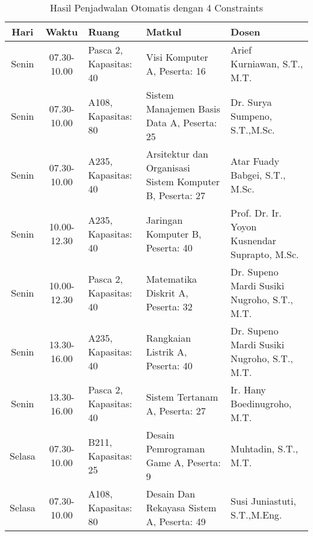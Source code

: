 \begin{longtable}[c]{|c|c|>{\centering\arraybackslash}m{2.5cm}|>{\centering\arraybackslash}m{4cm}|>{\centering\arraybackslash}m{3.2cm}|}
  \caption{Hasil Penjadwalan Otomatis dengan 4 Constraints}
  \label{tab:4}\\
  \hline
  \rowcolor[HTML]{C0C0C0} 
  Hari   & Waktu       & Ruang                  & Matkul                                                              & Dosen                                         \\ \hline
  Senin  & 07.30-10.00 & Pasca 2, Kapasitas: 40 & Visi Komputer A, \linebreak Peserta: 16                             & Arief Kurniawan, S.T., M.T.                   \\ \hline
  Senin  & 07.30-10.00 & A108, Kapasitas: 80    & Sistem Manajemen Basis Data A, \linebreak Peserta: 25               & Dr. Surya Sumpeno, S.T.,M.Sc.                 \\ \hline
  Senin  & 07.30-10.00 & A235, Kapasitas: 40    & Arsitektur dan Organisasi Sistem Komputer B, \linebreak Peserta: 27 & Atar Fuady Babgei, S.T., M.Sc.                \\ \hline
  Senin  & 10.00-12.30 & A235, Kapasitas: 40    & Jaringan Komputer B, \linebreak Peserta: 40                         & Prof. Dr. Ir. Yoyon Kusnendar Suprapto, M.Sc. \\ \hline
  Senin  & 10.00-12.30 & Pasca 2, Kapasitas: 40 & Matematika Diskrit A, \linebreak Peserta: 32                        & Dr. Supeno Mardi Susiki Nugroho, S.T., M.T.   \\ \hline
  Senin  & 13.30-16.00 & A235, Kapasitas: 40    & Rangkaian Listrik A, \linebreak Peserta: 40                         & Dr. Supeno Mardi Susiki Nugroho, S.T., M.T.   \\ \hline
  Senin  & 13.30-16.00 & Pasca 2, Kapasitas: 40 & Sistem Tertanam A, \linebreak Peserta: 27                           & Ir. Hany Boedinugroho, M.T.                   \\ \hline
  Selasa & 07.30-10.00 & B211, Kapasitas: 25    & Desain Pemrograman Game A, \linebreak Peserta: 9                    & Muhtadin, S.T., M.T.                          \\ \hline
  Selasa & 07.30-10.00 & A108, Kapasitas: 80    & Desain Dan Rekayasa Sistem A, \linebreak Peserta: 49                & Susi Juniastuti, S.T.,M.Eng.                  \\ \hline

\end{longtable}
